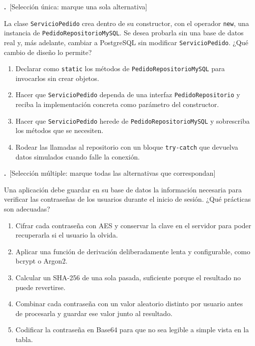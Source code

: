\documentclass[11pt,a4paper]{article}
\newif\ifclave
\newcounter{preg}
\newcommand{\tipounica}{\textcolor{uteqMid}{\small\textsf{[Selección única: marque una sola alternativa]}}}
\newcommand{\tipomultiple}{\textcolor{uteqAmber!80!black}{\small\textsf{[Selección múltiple: marque todas las alternativas que correspondan]}}}
\newcommand{\pregunta}[2]{%
	\refstepcounter{preg}%
	\par\medskip
	\noindent\textbf{\color{uteqBlue}\arabic{preg}.}~#1\par
	\noindent #2\par\nopagebreak
}
\newcommand{\ok}{\ifclave~\textcolor{uteqGreen}{\ding{51}~\textbf{Correcta}}\fi}
\newenvironment{opciones}{%
	\begin{enumerate}[label={$\square$\ \alph*)},leftmargin=2.6em,itemsep=1pt,topsep=2pt]
}{%
	\end{enumerate}
}
\newcommand{\just}[1]{%
	\ifclave
		\begin{tcolorbox}[colback=uteqGreen!6,colframe=uteqGreen!70!black,boxrule=0.4pt,arc=1mm,left=4pt,right=4pt,top=2pt,bottom=2pt,fontupper=\small]
			\textbf{Justificación:} #1
		\end{tcolorbox}
	\fi
}
\begin{document}
\pregunta{\tipounica}{La clase \texttt{ServicioPedido} crea dentro de su constructor, con el operador \texttt{new}, una instancia de \texttt{PedidoRepositorioMySQL}. Se desea probarla sin una base de datos real y, más adelante, cambiar a PostgreSQL sin modificar \texttt{ServicioPedido}. ¿Qué cambio de diseño lo permite?}
\begin{opciones}
	\item Declarar como \texttt{static} los métodos de \texttt{PedidoRepositorioMySQL} para invocarlos sin crear objetos.
	\item Hacer que \texttt{ServicioPedido} dependa de una interfaz \texttt{PedidoRepositorio} y reciba la implementación concreta como parámetro del constructor.\ok
	\item Hacer que \texttt{ServicioPedido} herede de \texttt{PedidoRepositorioMySQL} y sobrescriba los métodos que se necesiten.
	\item Rodear las llamadas al repositorio con un bloque \texttt{try-catch} que devuelva datos simulados cuando falle la conexión.
\end{opciones}
\just{Depender de una abstracción y recibir la implementación desde fuera (inversión de dependencias e inyección por constructor) permite pasar un repositorio simulado en las pruebas o uno de PostgreSQL en producción sin tocar la clase. Los métodos estáticos y la herencia aumentan el acoplamiento con MySQL; el \texttt{try-catch} oculta fallos en lugar de resolver el diseño.}

\pregunta{\tipomultiple}{Una aplicación debe guardar en su base de datos la información necesaria para verificar las contraseñas de los usuarios durante el inicio de sesión. ¿Qué prácticas son adecuadas?}
\begin{opciones}
	\item Cifrar cada contraseña con AES y conservar la clave en el servidor para poder recuperarla si el usuario la olvida.
	\item Aplicar una función de derivación deliberadamente lenta y configurable, como bcrypt o Argon2.\ok
	\item Calcular un SHA-256 de una sola pasada, suficiente porque el resultado no puede revertirse.
	\item Combinar cada contraseña con un valor aleatorio distinto por usuario antes de procesarla y guardar ese valor junto al resultado.\ok
	\item Codificar la contraseña en Base64 para que no sea legible a simple vista en la tabla.
\end{opciones}
\just{Las funciones adaptativas como bcrypt encarecen los ataques de fuerza bruta y la sal aleatoria por usuario impide el uso de tablas precalculadas y revela qué usuarios comparten contraseña \cite{provos1999bcrypt}. El cifrado reversible expone todas las contraseñas si se filtra la clave; SHA-256 es demasiado rápido para este fin; Base64 es una codificación, no una protección.}
\end{document}
